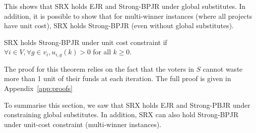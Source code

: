 \documentclass[runningheads]{llncs}
\begin{document}
This shows that SRX holds EJR and Strong-BPJR under global substitutes.
In addition, it is possible to show that for multi-winner instances (where all projects have unit cost), SRX holds Strong-BPJR (even without global substitutes).



\begin{theorem}\label{theorem:unit}
SRX holds Strong-BPJR under unit cost constraint if $\forall i\in V, \forall g\in v_i, u_{i,g}(k)>0$ for all $k\geq 0$.
\end{theorem}

The proof for this theorem relies on the fact that the voters in $S$ cannot waste more than 1  unit of their funds at each iteration. The full proof is given  in Appendix~\ref{app:proofs}





To summarise this section, we saw that SRX holds EJR and Strong-PBJR under constraining global substitutes. In addition, SRX can also hold Strong-BPJR under unit-cost constraint (multi-winner instances).
\end{document}
